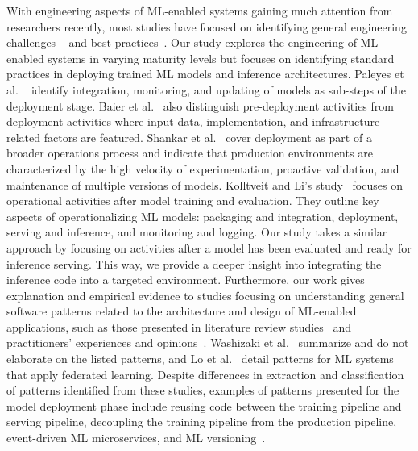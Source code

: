 With engineering aspects of ML-enabled systems gaining much attention from researchers recently, most studies have focused on identifying general engineering challenges ~\cite{lwakatare2019taxonomy, paleyes2022challenges, giray2021software, martinez2022software, baier2019challenges} and best practices~\cite{serban}. Our study explores the engineering of ML-enabled systems in varying maturity levels but focuses on identifying standard practices in deploying trained ML models and inference architectures. Paleyes et al. ~\cite{paleyes2022challenges} identify integration, monitoring, and updating of models as sub-steps of the deployment stage. Baier et al.~\cite{baier2019challenges} also distinguish pre-deployment activities from deployment activities where input data, implementation, and infrastructure-related factors are featured. Shankar et al.~\cite{shankar2022operationalizing} cover deployment as part of a broader operations process and indicate that production environments are characterized by the high velocity of experimentation, proactive validation, and maintenance of multiple versions of models. Kolltveit and Li's study~\cite{kolltveit2022operationalizing} focuses on operational activities after model training and evaluation. They outline key aspects of operationalizing ML models: packaging and integration, deployment, serving and inference, and monitoring and logging. Our study takes a similar approach by focusing on activities after a model has been evaluated and ready for inference serving. This way, we provide a deeper insight into integrating the inference code into a targeted environment.
Furthermore, our work gives explanation and empirical evidence to studies focusing on understanding general software patterns related to the architecture and design of ML-enabled applications, such as those presented in literature review studies~\cite{washizaki, Lo, heiland2023design} and practitioners' experiences and opinions~\cite{lakshmanan2020machine, take}. Washizaki et al.~\cite{washizaki} summarize and do not elaborate on the listed patterns, and Lo et al.~\cite{Lo} detail patterns for ML systems that apply federated learning. Despite differences in extraction and classification of patterns identified from these studies, examples of patterns presented for the model deployment phase include reusing code between the training pipeline and serving pipeline, decoupling the training pipeline from the production pipeline, event-driven ML microservices, and ML versioning~\cite{washizaki}. %

